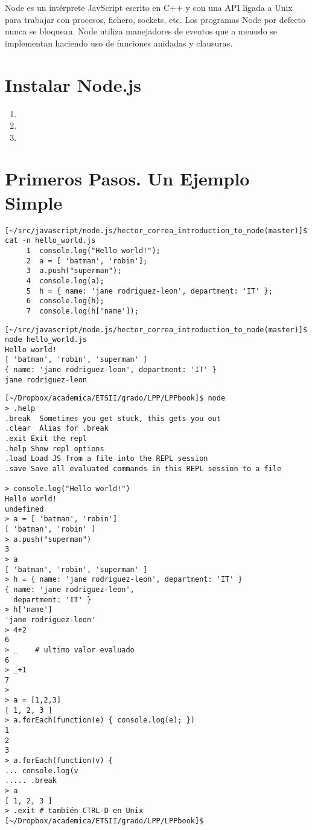 Node es un intérprete JavScript escrito en C++ y con una API ligada a
Unix para trabajar con procesos, fichero, sockets, etc.  Los programas
Node por defecto nunca se bloquean. Node utiliza manejadores de eventos
que a menudo se implementan haciendo uso de funciones anidadas  y
clausuras.


\section{Instalar Node.js}
\begin{enumerate}
\item {}
\item 
{}
\item 
{}
\end{enumerate}


\section{Primeros Pasos. Un Ejemplo Simple}
\begin{verbatim}
[~/src/javascript/node.js/hector_correa_introduction_to_node(master)]$ cat -n hello_world.js 
     1  console.log("Hello world!");
     2  a = [ 'batman', 'robin'];
     3  a.push("superman");
     4  console.log(a);
     5  h = { name: 'jane rodriguez-leon', department: 'IT' };
     6  console.log(h);
     7  console.log(h['name']);
\end{verbatim}

\begin{verbatim}
[~/src/javascript/node.js/hector_correa_introduction_to_node(master)]$ node hello_world.js 
Hello world!
[ 'batman', 'robin', 'superman' ]
{ name: 'jane rodriguez-leon', department: 'IT' }
jane rodriguez-leon
\end{verbatim}

\begin{verbatim}
[~/Dropbox/academica/ETSII/grado/LPP/LPPbook]$ node
> .help
.break  Sometimes you get stuck, this gets you out
.clear  Alias for .break
.exit Exit the repl
.help Show repl options
.load Load JS from a file into the REPL session
.save Save all evaluated commands in this REPL session to a file

> console.log("Hello world!")
Hello world!
undefined
> a = [ 'batman', 'robin']
[ 'batman', 'robin' ]
> a.push("superman")
3
> a
[ 'batman', 'robin', 'superman' ]
> h = { name: 'jane rodriguez-leon', department: 'IT' }
{ name: 'jane rodriguez-leon',
  department: 'IT' }
> h['name']
'jane rodriguez-leon'
> 4+2
6
> _    # ultimo valor evaluado
6
> _+1
7
> 
> a = [1,2,3]
[ 1, 2, 3 ]
> a.forEach(function(e) { console.log(e); })
1
2
3
> a.forEach(function(v) {
... console.log(v
..... .break
> a
[ 1, 2, 3 ]
> .exit # también CTRL-D en Unix
[~/Dropbox/academica/ETSII/grado/LPP/LPPbook]$ 
\end{verbatim}


